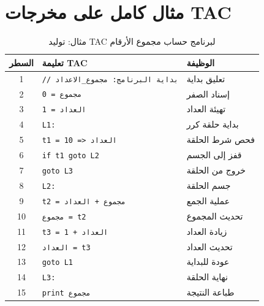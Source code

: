 \documentclass[12pt,a4paper]{report}
\begin{document}
\section{مثال كامل على مخرجات TAC}

\begin{table}[H]
\caption{\arabicfont مثال: توليد TAC لبرنامج حساب مجموع الأرقام}
\label{tab:tac-example}
\centering
\begin{tabular}{|c|l|l|}
\hline
\rowcolor{TableHead}
\textbf{\arabicfont السطر} & \textbf{\arabicfont تعليمة TAC} & \textbf{\arabicfont الوظيفة} \\
\hline
1  & \texttt{// بداية البرنامج: مجموع\_الاعداد} & \arabicfont تعليق بداية \\
\hline
\rowcolor{TableAlt}
2  & \texttt{مجموع = 0}                     & \arabicfont إسناد الصفر \\
\hline
3  & \texttt{العداد = 1}                     & \arabicfont تهيئة العداد \\
\hline
\rowcolor{TableAlt}
4  & \texttt{L1:}                            & \arabicfont بداية حلقة كرر \\
\hline
5  & \texttt{t1 = العداد <= 10}              & \arabicfont فحص شرط الحلقة \\
\hline
\rowcolor{TableAlt}
6  & \texttt{if t1 goto L2}                  & \arabicfont قفز إلى الجسم \\
\hline
7  & \texttt{goto L3}                        & \arabicfont خروج من الحلقة \\
\hline
\rowcolor{TableAlt}
8  & \texttt{L2:}                            & \arabicfont جسم الحلقة \\
\hline
9  & \texttt{t2 = مجموع + العداد}           & \arabicfont عملية الجمع \\
\hline
\rowcolor{TableAlt}
10 & \texttt{مجموع = t2}                    & \arabicfont تحديث المجموع \\
\hline
11 & \texttt{t3 = العداد + 1}               & \arabicfont زيادة العداد \\
\hline
\rowcolor{TableAlt}
12 & \texttt{العداد = t3}                   & \arabicfont تحديث العداد \\
\hline
13 & \texttt{goto L1}                        & \arabicfont عودة للبداية \\
\hline
\rowcolor{TableAlt}
14 & \texttt{L3:}                            & \arabicfont نهاية الحلقة \\
\hline
15 & \texttt{print مجموع}                   & \arabicfont طباعة النتيجة \\
\hline
\end{tabular}
\end{table}
\end{document}
